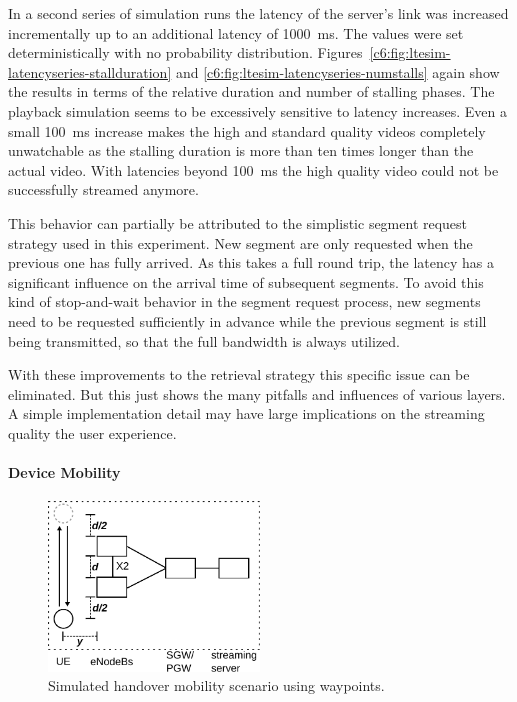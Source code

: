 In a second series of simulation runs the latency of the server's link was increased incrementally up to an additional latency of \SI{1000}{\milli\second}. The values were set deterministically with no probability distribution. Figures~\ref{c6:fig:ltesim-latencyseries-stallduration} and \ref{c6:fig:ltesim-latencyseries-numstalls} again show the results in terms of the relative duration and number of stalling phases. The playback simulation seems to be excessively sensitive to latency increases. Even a small \SI{100}{\milli\second} increase makes the high and standard quality videos completely unwatchable as the stalling duration is more than ten times longer than the actual video. With latencies beyond \SI{100}{\milli\second} the high quality video could not be successfully streamed anymore. 


This behavior can partially be attributed to the simplistic segment request strategy used in this experiment. New segment are only requested when the previous one has fully arrived. As this takes a full round trip, the latency has a significant influence on the arrival time of subsequent segments. To avoid this kind of stop-and-wait behavior in the segment request process, new segments need to be requested sufficiently in advance while the previous segment is still being transmitted, so that the full bandwidth is always utilized.

With these improvements to the retrieval strategy this specific issue can be eliminated. But this just shows the many pitfalls and influences of various layers. A simple implementation detail may have large implications on the streaming quality the user experience.


\paragraph{Device Mobility}

\begin{figure}[htb]
	\centering
	\includegraphics[width=0.5\textwidth]{images/streaming-simulation-mobility.pdf}
	\caption{Simulated handover mobility scenario using waypoints.}
\label{c6:fig:streaming-simulation-mobility}
\end{figure}

